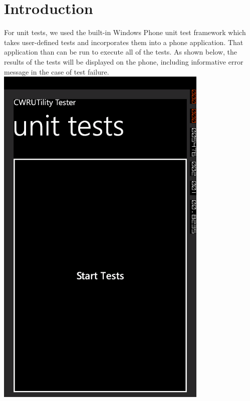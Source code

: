 \documentclass[pdftex,12pt,letter]{article}
\begin{document}
\section{Introduction}
For unit tests, we used the built-in Windows Phone unit test framework which takes user-defined tests and incorporates them into a phone application. That application than can be run to execute all of the tests. As shown below, the results of the tests will be displayed on the phone, including informative error message in the case of test failure.
\includegraphics[width=4in]{ss1.png}
\FloatBarrier
\end{document}
